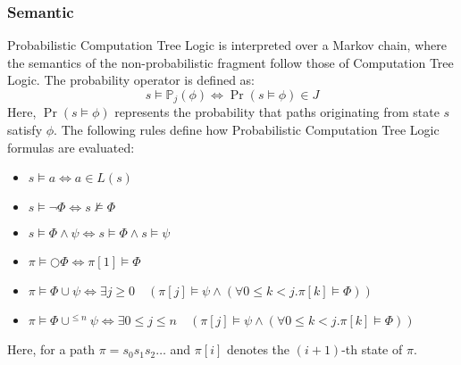 \subsubsection{Semantic}
Probabilistic Computation Tree Logic is interpreted over a Markov chain, where the semantics of the non-probabilistic fragment follow those of Computation Tree Logic. 
The probability operator is defined as:
\[s\models\mathbb{P}_j(\phi)\Leftrightarrow\Pr(s\models\phi)\in J\]
Here, $\Pr(s\models\phi)$ represents the probability that paths originating from state $s$ satisfy $\phi$. 
The following rules define how Probabilistic Computation Tree Logic formulas are evaluated:
\begin{itemize}
    \item $s \models a \Leftrightarrow a \in L(s)$
    \item $s \models \lnot\Phi \Leftrightarrow s \not\models \Phi$
    \item $s \models \Phi \land \psi \Leftrightarrow s \models \Phi \land s \models \psi$
    \item $\pi \models \bigcirc \Phi \Leftrightarrow \pi[1] \models \Phi$
    \item $\pi \models \Phi \cup \psi \Leftrightarrow \exists j \geq 0 \quad(\pi[j] \models \psi \land (\forall 0 \leq k < j. \pi[k] \models \Phi))$
    \item $\pi \models \Phi \cup^{\leq n} \psi \Leftrightarrow \exists 0 \leq j \leq n \quad(\pi[j] \models \psi \land (\forall 0 \leq k < j. \pi[k] \models \Phi))$
\end{itemize}
Here, for a path $\pi = s_0 s_1 s_2 \dots$ and $\pi[i]$ denotes the $(i+1)$-th state of $\pi$.

